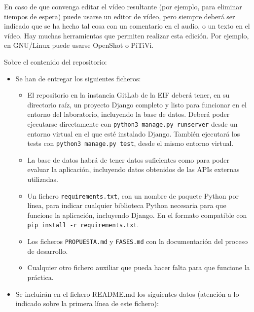 \begin{enumerate}
En caso de que convenga editar el vídeo resultante (por ejemplo, para eliminar tiempos de espera) puede usarse un editor de vídeo, pero siempre deberá ser indicado que se ha hecho tal cosa con un comentario en el audio, o un texto en el vídeo. Hay muchas herramientas que permiten realizar esta edición. Por ejemplo, en GNU/Linux puede usarse OpenShot o PiTiVi.

\end{enumerate}

Sobre el contenido del repositorio:
\begin{itemize}
  \item Se han de entregar los siguientes ficheros:

\begin{itemize}
\item El repositorio en la instancia GitLab de la EIF deberá tener, en su directorio raíz, un proyecto Django completo y listo para funcionar en el entorno del laboratorio, incluyendo la base de datos. Deberá poder ejecutarse directamente con \verb|python3 manage.py runserver| desde un entorno virtual en el que esté instalado Django. También ejecutará los tests con \verb|python3 manage.py test|, desde el mismo entorno virtual.

\item La base de datos habrá de tener datos suficientes como para poder evaluar la aplicación, incluyendo datos obtenidos de las APIs externas utilizadas.

\item Un fichero \verb|requirements.txt|, con un nombre de paquete Python por línea, para indicar cualquier biblioteca Python necesaria para que funcione la aplicación, incluyendo Django. En el formato compatible con \verb|pip install -r requirements.txt|.

\item Los ficheros \texttt{PROPUESTA.md} y \texttt{FASES.md} con la documentación del proceso de desarrollo.

\item Cualquier otro fichero auxiliar que pueda hacer falta para que funcione la práctica.
\end{itemize}

\item Se incluirán en el fichero README.md los siguientes datos (atención a lo indicado sobre la primera línea de este fichero):


\end{itemize}
